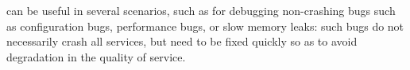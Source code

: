 


 \parikshan can be useful in several scenarios, such as for debugging non-crashing bugs such as configuration bugs, performance bugs, or slow memory leaks: such bugs do not necessarily crash all services, but need to be fixed quickly so as to avoid degradation in the quality of service.

